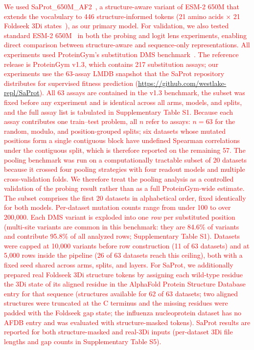 \documentclass[11pt,a4paper]{article}
\newcommand{\rev}[1]{\textcolor{red}{#1}}
\begin{document}
\textcolor{red}{We used SaProt\_650M\_AF2~\cite{su2024saprot}, a structure-aware variant of ESM-2 650M
that extends the vocabulary to 446 structure-informed tokens (21 amino acids $\times$ 21
Foldseek 3Di states~\cite{vankempen2024foldseek}), as our primary model. For validation,
we also tested standard ESM-2 650M~\cite{lin2023evolutionary} in both the probing and
logit lens experiments, enabling direct comparison between structure-aware and
sequence-only representations. All experiments used ProteinGym's substitution DMS
benchmark~\cite{notin2024proteingym}. \rev{The reference release is ProteinGym
v1.3, which contains 217 substitution assays; our experiments use the 63-assay
LMDB snapshot that the SaProt repository distributes for supervised fitness
prediction (\url{https://github.com/westlake-repl/SaProt}). All 63 assays are
contained in the v1.3 benchmark, the subset was fixed before any experiment and
is identical across all arms, models, and splits, and the full assay list is
tabulated in Supplementary Table S1. Because each assay contributes one
train--test problem, all $n$ refer to assays: $n = 63$ for the random, modulo,
and position-grouped splits; six datasets whose mutated positions form a single
contiguous block have undefined Spearman correlations under the contiguous
split, which is therefore reported on the remaining 57.}
The pooling benchmark was run on a computationally tractable subset of
20 datasets because it crossed four pooling strategies with four readout models and
multiple cross-validation folds. We therefore treat the pooling analysis as a
controlled validation of the probing result rather than as a full ProteinGym-wide
estimate. \rev{The subset comprises the first 20 datasets in alphabetical order,
fixed identically for both models.} Per-dataset mutation counts range from under 100 to over 200,000.
\rev{Each DMS variant is exploded into one \emph{row} per substituted position
(multi-site variants are common in this benchmark: they are
84.6\% of variants and contribute 95.8\% of all analyzed rows;
Supplementary Table S1). Datasets were capped at 10,000 variants before row construction
(11 of 63 datasets) and at 5,000 rows inside the pipeline (26 of 63 datasets
reach this ceiling), both with a fixed seed shared across arms, splits, and
layers. For SaProt, we additionally prepared real Foldseek 3Di structure tokens by
assigning each wild-type residue the 3Di state of its aligned residue in the
AlphaFold Protein Structure Database entry for that sequence (structures available for
62 of 63 datasets; two aligned structures were truncated at the C terminus and the
missing residues were padded with the Foldseek gap state; the influenza nucleoprotein
dataset has no AFDB entry and was evaluated with structure-masked tokens). SaProt
results are reported for both structure-masked and real-3Di inputs
(per-dataset 3Di file lengths and gap counts in Supplementary Table
S5).}}
\end{document}
